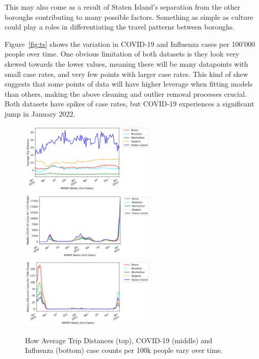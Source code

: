 \documentclass[11pt]{article}
\begin{document}
\begin{multicols}{2}

    This may also come as a result of Staten Island's separation from the other boroughs
    contributing to many possible factors.
    Something as simple as culture could play a roles in differentiating the travel patterns between boroughs.

    Figure~\ref{fig:ts} shows the variation in COVID-19 and Influenza cases per 100'000 people over time.
    One obvious limitation of both datasets is they look very skewed towards the lower values,
    meaning there will be many datapoints with small case rates, and very few points with larger case rates.
    This kind of skew suggests that some points of data will have higher leverage when fitting models than others,
    making the above cleaning and outlier removal processes crucial.
    Both datasets have spikes of case rates, but COVID-19 experiences a significant jump in January 2022.
    
    \begin{figure}[H]

        \centering

        \includegraphics[width=0.58\textwidth]{../plots/time-series-Average Trip Distance-vs-MMWR Weeks (End Dates)-by-pu_borough.png}
        \includegraphics[width=0.58\textwidth]{../plots/time-series-Weekly COVID-19 Cases Per 100k People-vs-MMWR Weeks (End Dates)-by-borough.png}
        \includegraphics[width=0.58\textwidth]{../plots/time-series-Weekly Influenza Cases Per 100k People-vs-MMWR Weeks (End Dates)-by-borough.png}
        \caption{How Average Trip Distances (top), COVID-19 (middle) and Influenza (bottom) case counts per 100k people vary over time.} %


\end{figure}
\end{multicols}
\end{document}
